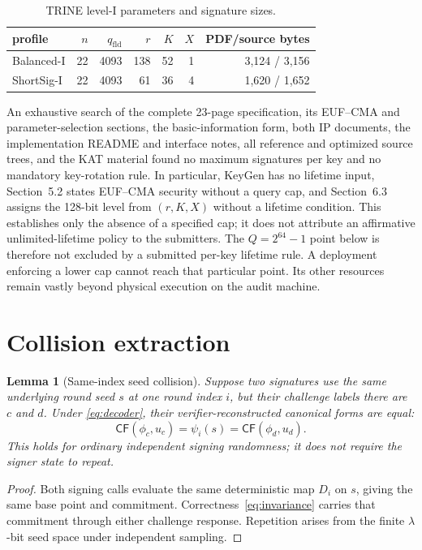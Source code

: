 \documentclass[11pt,a4paper]{article}
\newtheorem{lemma}[theorem]{Lemma}
\newcommand{\CF}{\mathsf{CF}}
\newcommand{\qfld}{q_{\mathrm{fld}}}
\begin{document}
\begin{table}[ht]
\centering
\caption{TRINE level-I parameters and signature sizes.}
\label{tab:params}
\begin{tabular}{lrrrrrr}
\toprule
profile & $n$ & $\qfld$ & $r$ & $K$ & $X$ & PDF/source bytes\\
\midrule
Balanced-I & 22 & 4093 & 138 & 52 & 1 & 3,124 / 3,156\\
ShortSig-I & 22 & 4093 & 61 & 36 & 4 & 1,620 / 1,652\\
\bottomrule
\end{tabular}
\end{table}

An exhaustive search of the complete 23-page specification, its EUF--CMA and
parameter-selection sections, the basic-information form, both IP documents,
the implementation README and interface notes, all reference and optimized
source trees, and the KAT material found no maximum signatures per key and no
mandatory key-rotation rule.  In particular, KeyGen has no lifetime input,
Section~5.2 states EUF--CMA security without a query cap, and Section~6.3
assigns the 128-bit level from $(r,K,X)$ without a lifetime condition.  This
establishes only the absence of a specified cap; it does not attribute an
affirmative unlimited-lifetime policy to the submitters.  The
$Q=2^{64}-1$ point below is therefore not excluded by a submitted per-key
lifetime rule.  A deployment enforcing a lower cap cannot reach that
particular point.  Its
other resources remain vastly beyond physical execution on the audit machine.

\section{Collision extraction}

\begin{lemma}[Same-index seed collision]\label{lem:seedcollision}
Suppose two signatures use the same underlying round seed $s$ at one round
index $i$, but their challenge labels there are $c$ and $d$.  Under
\eqref{eq:decoder}, their verifier-reconstructed canonical forms are equal:
\[
             \CF(\phi_c,u_c)=\psi_i(s)=\CF(\phi_d,u_d).
\]
This holds for ordinary independent signing randomness; it does not require
the signer state to repeat.
\end{lemma}
\begin{proof}
Both signing calls evaluate the same deterministic map $D_i$ on $s$, giving
the same base point and commitment.  Correctness~\eqref{eq:invariance} carries
that commitment through either challenge response.  Repetition arises from
the finite $\lambda$-bit seed space under independent sampling.
\end{proof}
\end{document}
